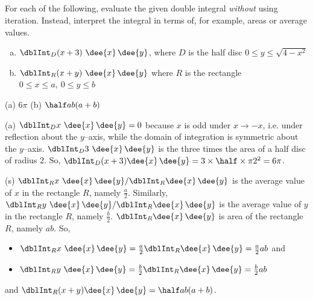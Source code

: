 


\subsection*{\Conceptual}

\begin{question}
For each of the following, evaluate the given double integral 
\emph{without} using iteration. Instead, interpret the integral in terms of, 
for example, areas or average values.
\begin{enumerate}[(a)]
\item
$\dblInt_D(x+3)\ \dee{x}\,\dee{y}$, where $D$ is the half disc 
$0\le y\le \sqrt{4-x^2}$
\item
$\dblInt_R (x+y)\ \dee{x}\,\dee{y}$ where $R$ is the rectangle 
$0\le x\le a,\ 0\le y\le b$
\end{enumerate}
\end{question}

%

\begin{answer}
(a) $6\pi$\qquad
(b) $\half ab (a+b)$
\end{answer}

\begin{solution}
(a) $\dblInt_D x\ \dee{x}\,\dee{y}=0$ because $x$ is odd under $x\rightarrow-x$,
i.e. under reflection about the $y$--axis, while the domain of integration 
is symmetric about the $y$--axis. 
$\dblInt_D 3\  \dee{x}\,\dee{y}$ is the three times the area of a half disc 
of radius $2$. So, 
$\dblInt_D(x+3)\dee{x}\,\dee{y}=3\times \half\times\pi 2^2=6\pi$.

(s) $\dblInt_R x\ \dee{x}\,\dee{y}/\dblInt_R \dee{x}\,\dee{y}$ is the average
value of $x$ in the rectangle $R$, namely $\frac{a}{2}$. Similarly,
$\dblInt_R y\ \dee{x}\,\dee{y}/\dblInt_R \dee{x}\,\dee{y}$ is the average
value of $y$ in the rectangle $R$, namely $\frac{b}{2}$.
$\dblInt_R \dee{x}\,\dee{y}$ is area of the rectangle $R$, namely $ab$. So, 
\begin{itemize}
\item
$\dblInt_R x\ \dee{x}\,\dee{y}
=\frac{a}{2} \dblInt_R \dee{x}\,\dee{y}
=\frac{a}{2} ab$ and
\item
$\dblInt_R y\ \dee{x}\,\dee{y}
=\frac{b}{2} \dblInt_R \dee{x}\,\dee{y}
=\frac{b}{2} ab$
\end{itemize}
and $\dblInt_R (x+y)\dee{x}\,\dee{y}=\half ab (a+b)$.
\end{solution}


